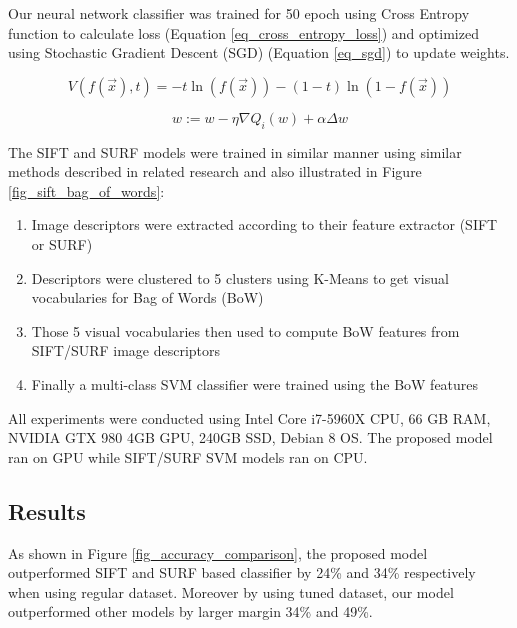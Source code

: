 \documentclass[conference, compsoc]{IEEEtran}
\begin{document}
Our neural network classifier was trained for 50 epoch using Cross Entropy function to calculate loss (Equation \ref{eq_cross_entropy_loss}) and optimized using Stochastic Gradient Descent (SGD) (Equation \ref{eq_sgd}) to update weights.

\begin{equation}
V(f(\vec{x}),t) = -t\ln(f(\vec{x}))-(1-t)\ln(1-f(\vec{x}))
\label{eq_cross_entropy_loss}
\end{equation}

\begin{equation}
w:=w-\eta \nabla Q_{i}(w)+\alpha \Delta w
\label{eq_sgd}
\end{equation}

The SIFT and SURF models were trained in similar manner using similar methods described in related research \cite{azhar2015batik} and also illustrated in Figure \ref{fig_sift_bag_of_words}:

\begin{enumerate}
	\item Image descriptors were extracted according to their feature extractor (SIFT or SURF)
	\item Descriptors were clustered to 5 clusters using K-Means to get visual vocabularies for Bag of Words (BoW)
	\item Those 5 visual vocabularies then used to compute BoW features from SIFT/SURF image descriptors
	\item Finally a multi-class SVM classifier were trained using the BoW features
\end{enumerate}

All experiments were conducted using Intel Core i7-5960X CPU, 66 GB RAM, NVIDIA GTX 980 4GB GPU, 240GB SSD, Debian 8 OS. The proposed model ran on GPU while SIFT/SURF SVM models ran on CPU.

\subsection{Results}

As shown in Figure \ref{fig_accuracy_comparison}, the proposed model outperformed SIFT and SURF based classifier by 24\% and 34\% respectively when using regular dataset. Moreover by using tuned dataset, our model outperformed other models by larger margin 34\% and 49\%.
\end{document}
